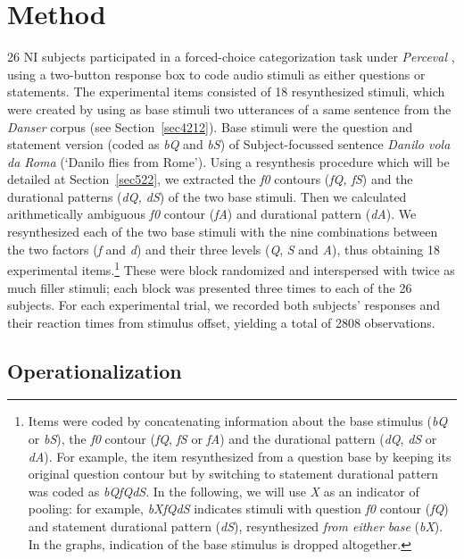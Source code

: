 \section{Method}\label{sec52}
26 NI subjects participated in a forced-choice categorization task under \textit{Perceval} \citep{andre2003perceval}, using a two-button response box to code audio stimuli as either questions or statements. The experimental items consisted of 18 resynthesized stimuli, which were created by using as base stimuli two utterances of a same sentence from the \textit{Danser} corpus (see Section~\ref{sec4212}). Base stimuli were the question and statement version (coded as \textit{bQ} and \textit{bS}) of Subject-focussed sentence \textit{Danilo vola da Roma} (`Danilo flies from Rome'). Using a resynthesis procedure which will be detailed at Section~\ref{sec522}, we extracted the \textit{f0} contours (\textit{fQ, fS}) and the durational patterns (\textit{dQ, dS}) of the two base stimuli. Then we calculated arithmetically ambiguous \textit{f0} contour (\textit{fA}) and durational pattern (\textit{dA}). We resynthesized each of the two base stimuli with the nine combinations between the two factors (\textit{f} and \textit{d}) and their three levels (\textit{Q}, \textit{S} and \textit{A}), thus obtaining 18 experimental items.\footnote{Items were coded by concatenating information about the base stimulus (\textit{bQ} or \textit{bS}), the \textit{f0} contour (\textit{fQ}, \textit{fS} or \textit{fA}) and the durational pattern (\textit{dQ}, \textit{dS} or \textit{dA}). For example, the item resynthesized from a question base by keeping its original question contour but by switching to statement durational pattern was coded as \textit{bQfQdS}. In the following, we will use \textit{X} as an indicator of pooling: for example, \textit{bXfQdS} indicates stimuli with question \textit{f0} contour (\textit{fQ}) and statement durational pattern (\textit{dS}), resynthesized \textit{from either base} (\textit{bX}). In the graphs, indication of the base stimulus is dropped altogether.} These were block randomized and interspersed with twice as much filler stimuli; each block was presented three times to each of the 26 subjects.
\enlargethispage{1em}
For each experimental trial, we recorded both subjects' responses and their reaction times from stimulus offset, yielding a total of 2808 observations.

\subsection{Operationalization}\label{sec521}

